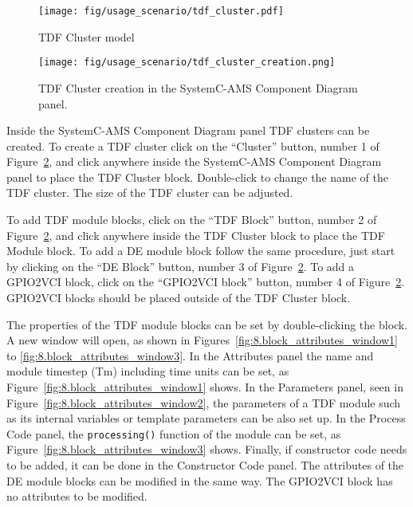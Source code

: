 \begin{figure}[h]
    \centering
    \texttt{[image: fig/usage\_scenario/tdf\_cluster.pdf]}
    \caption{TDF Cluster model}
    \label{fig:8.usage_scenario_tdf_model}
\end{figure}


\begin{figure}[h]
    \centering
    \texttt{[image: fig/usage\_scenario/tdf\_cluster\_creation.png]}
    \caption{TDF Cluster creation in the SystemC-AMS Component Diagram panel.}
    \label{fig:8.tdf_cluster_creation}
\end{figure}

Inside the SystemC-AMS Component Diagram panel TDF clusters can be created. To create a TDF cluster click on the ``Cluster'' button, number 1 of Figure~\ref{fig:8.tdf_cluster_creation}, and click anywhere inside the SystemC-AMS Component Diagram panel to place the TDF Cluster block. Double-click to change the name of the TDF cluster. The size of the TDF cluster can be adjusted. 

To add TDF module blocks, click on the ``TDF Block'' button, number 2 of Figure~\ref{fig:8.tdf_cluster_creation}, and click anywhere inside the TDF Cluster block to place the TDF Module block. To add a DE module block follow the same procedure, just start by clicking on the ``DE Block'' button, number 3 of Figure~\ref{fig:8.tdf_cluster_creation}. To add a GPIO2VCI block, click on the ``GPIO2VCI block'' button, number 4 of Figure~\ref{fig:8.tdf_cluster_creation}. GPIO2VCI blocks should be placed outside of the TDF Cluster block.


The properties of the TDF module blocks can be set by double-clicking the block. A new window will open, as shown in Figures~\ref{fig:8.block_attributes_window1} to \ref{fig:8.block_attributes_window3}. In the Attributes panel the name and module timestep (Tm) including time units can be set, as Figure~\ref{fig:8.block_attributes_window1} shows. In the Parameters panel, seen in Figure~\ref{fig:8.block_attributes_window2}, the parameters of a TDF module such as its internal variables or template parameters can be also set up. In the Process Code panel, the \texttt{processing()} function of the module can be set, as Figure~\ref{fig:8.block_attributes_window3} shows. Finally, if constructor code needs to be added, it can be done in the Constructor Code panel. The attributes of the DE module blocks can be modified in the same way. The GPIO2VCI block has no attributes to be modified. 

